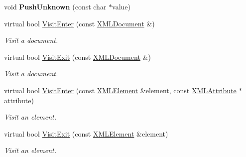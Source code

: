 \begin{DoxyCompactItemize}
\item 
\mbox{\label{classtinyxml2_1_1XMLPrinter_ab1efc6d1548505e9984185f58f54b713}} 
void {\bfseries Push\+Unknown} (const char $\ast$value)
\item 
\mbox{\label{classtinyxml2_1_1XMLPrinter_ae966b988a7a28c41e91c5ca17fb2054b}} 
virtual bool \hyperlink{classtinyxml2_1_1XMLPrinter_ae966b988a7a28c41e91c5ca17fb2054b}{Visit\+Enter} (const \hyperlink{classtinyxml2_1_1XMLDocument}{X\+M\+L\+Document} \&)
\begin{DoxyCompactList}\small\item\em Visit a document. \end{DoxyCompactList}\item 
\mbox{\label{classtinyxml2_1_1XMLPrinter_a15fc1f2b922f540917dcf52808737b29}} 
virtual bool \hyperlink{classtinyxml2_1_1XMLPrinter_a15fc1f2b922f540917dcf52808737b29}{Visit\+Exit} (const \hyperlink{classtinyxml2_1_1XMLDocument}{X\+M\+L\+Document} \&)
\begin{DoxyCompactList}\small\item\em Visit a document. \end{DoxyCompactList}\item 
\mbox{\label{classtinyxml2_1_1XMLPrinter_a2ce2aa508c21ac91615093ddb9c282c5}} 
virtual bool \hyperlink{classtinyxml2_1_1XMLPrinter_a2ce2aa508c21ac91615093ddb9c282c5}{Visit\+Enter} (const \hyperlink{classtinyxml2_1_1XMLElement}{X\+M\+L\+Element} \&element, const \hyperlink{classtinyxml2_1_1XMLAttribute}{X\+M\+L\+Attribute} $\ast$attribute)
\begin{DoxyCompactList}\small\item\em Visit an element. \end{DoxyCompactList}\item 
\mbox{\label{classtinyxml2_1_1XMLPrinter_ae99e0a7086543591edfb565f24689098}} 
virtual bool \hyperlink{classtinyxml2_1_1XMLPrinter_ae99e0a7086543591edfb565f24689098}{Visit\+Exit} (const \hyperlink{classtinyxml2_1_1XMLElement}{X\+M\+L\+Element} \&element)
\begin{DoxyCompactList}\small\item\em Visit an element. \end{DoxyCompactList}\item 

\end{DoxyCompactItemize}
